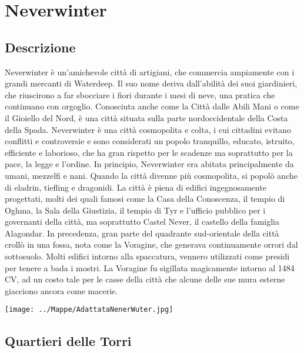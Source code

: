 \documentclass{article}
\begin{document}
\section{Neverwinter}

          \subsection{Descrizione} Neverwinter è un’amichevole città di artigiani, che commercia ampiamente con i grandi mercanti di Waterdeep. Il suo nome deriva dall’abilità dei suoi giardinieri, che riuscirono a far sbocciare i fiori durante i mesi di neve, una pratica che continuano con orgoglio. Conosciuta anche come la Città dalle Abili Mani o come il Gioiello del Nord, è una città situata sulla parte nordoccidentale della Costa della Spada. Neverwinter è una città cosmopolita e colta, i cui cittadini evitano conflitti e controversie e sono considerati un popolo tranquillo, educato, istruito, efficiente e laborioso, che ha gran rispetto per le scadenze ma soprattutto per la pace, la legge e l’ordine. In principio, Neverwinter era abitata principalmente da umani, mezzelfi e nani. Quando la città divenne più cosmopolita, si popolò anche di eladrin, tiefling e dragonidi.
La città è piena di edifici ingegnosamente progettati, molti dei quali famosi come la Casa della Conoscenza, il tempio di Oghma, la Sala della Giustizia, il tempio di Tyr e l’ufficio pubblico per i governanti della città, ma soprattutto Castel Never, il castello della famiglia Alagondar. In precedenza, gran parte del quadrante sud-orientale della città crollò in una fossa, nota come la Voragine, che generava continuamente orrori dal sottosuolo. Molti edifici intorno alla spaccatura, vennero utilizzati come presidi per tenere a bada i mostri. La Voragine fu sigillata magicamente intorno al 1484 CV, ad un costo tale per le casse della città che alcune delle sue mura esterne giacciono ancora come macerie.




\begin{landscape}
        \texttt{[image: ../Mappe/AdattataNenerWuter.jpg]}
       
   
    
\end{landscape}

          \subsection{Quartieri delle Torri}
\end{document}
